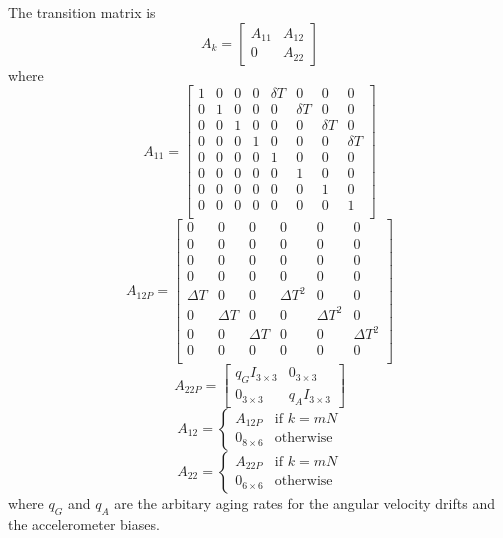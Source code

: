 \documentclass[a4paper]{report}
\numberwithin{equation}{chapter}
\begin{document}
The transition matrix is
\begin{equation}
A_k =
\begin{bmatrix}
A_{11} & A_{12}\\
0 & A_{22}
\end{bmatrix}
\end{equation}
where
\begin{equation}
A_{11} =
\begin{bmatrix}
1 & 0 & 0 & 0 & \delta T & 0 & 0 & 0\\
0 & 1 & 0 & 0 & 0 & \delta T & 0 & 0\\
0 & 0 & 1 & 0 & 0 & 0 & \delta T & 0\\
0 & 0 & 0 & 1 & 0 & 0 & 0 & \delta T\\
0 & 0 & 0 & 0 & 1 & 0 & 0 & 0\\
0 & 0 & 0 & 0 & 0 & 1 & 0 & 0\\
0 & 0 & 0 & 0 & 0 & 0 & 1 & 0\\
0 & 0 & 0 & 0 & 0 & 0 & 0 & 1\\
\end{bmatrix}
\end{equation}
\begin{equation}
A_{12P} =
\begin{bmatrix}
0 & 0 & 0 & 0 & 0 & 0\\
0 & 0 & 0 & 0 & 0 & 0\\
0 & 0 & 0 & 0 & 0 & 0\\
0 & 0 & 0 & 0 & 0 & 0\\
\Delta T & 0 & 0 & \Delta T^2 & 0 & 0\\
0 & \Delta T & 0 & 0 & \Delta T^2 & 0\\
0 & 0 & \Delta T & 0 & 0 & \Delta T^2\\
0 & 0 & 0 & 0 & 0 & 0\\
\end{bmatrix}
\end{equation}
\begin{equation}
A_{22P} =
\begin{bmatrix}
q_G I_{3 \times 3} & 0_{3 \times 3}\\
0_{3 \times 3} & q_A I_{3 \times 3}
\end{bmatrix}
\end{equation}
\begin{equation}
A_{12} =
\begin{cases}
A_{12P} & \text{if $k = mN$}\\
0_{8 \times 6} & \text{otherwise}
\end{cases}
\end{equation}
\begin{equation}
A_{22} =
\begin{cases}
A_{22P} & \text{if $k = mN$}\\
0_{6 \times 6} & \text{otherwise}
\end{cases}
\end{equation}
where $q_G$ and $q_A$ are the arbitary aging rates for the angular velocity drifts and the accelerometer biases.
\end{document}
